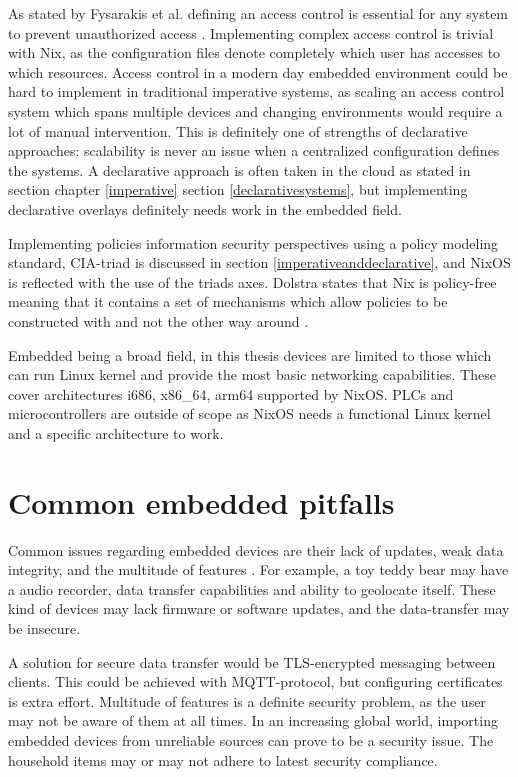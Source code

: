 As stated by Fysarakis et al. defining an access control is essential
for any system to prevent unauthorized access
\cite{fysarakis2014embedded}. Implementing complex access control is
trivial with Nix, as the configuration files denote completely which
user has accesses to which resources. Access control in a modern day
embedded environment could be hard to implement in traditional
imperative systems, as scaling an access control system which spans
multiple devices and changing environments would require a lot of
manual intervention. This is definitely one of strengths of
declarative approaches: scalability is never an issue when a
centralized configuration defines the systems. A declarative approach
is often taken in the cloud as stated in section chapter
\ref{imperative} section \ref{declarativesystems}, but implementing
declarative overlays definitely needs work in the embedded field.

Implementing policies information security perspectives using a policy
modeling standard, CIA-triad is discussed in section
\ref{imperativeanddeclarative}, and NixOS is reflected with the use of
the triads axes. Dolstra states that Nix is policy-free meaning that
it contains a set of mechanisms which allow policies to be constructed
with and not the other way around \cite{dolstra2004nix}.

Embedded being a broad field, in this thesis devices are limited to
those which can run Linux kernel and provide the most basic networking
capabilities. These cover architectures i686, x86\_64, arm64 supported
by NixOS. PLCs and microcontrollers are outside of scope as NixOS
needs a functional Linux kernel and a specific architecture to work.

\section{Common embedded pitfalls}

Common issues regarding embedded devices are their lack of updates,
weak data integrity, and the multitude of features
\cite{kemmerer2003cybersecurity, fysarakis2014embedded}. For example,
a toy teddy bear may have a audio recorder, data transfer capabilities
and ability to geolocate itself. These kind of devices may lack
firmware or software updates, and the data-transfer may be insecure.

A solution for secure data transfer would be TLS-encrypted messaging
between clients. This could be achieved with MQTT-protocol, but
configuring certificates is extra effort. Multitude of features is a
definite security problem, as the user may not be aware of them at all
times. In an increasing global world, importing embedded devices from
unreliable sources can prove to be a security issue. The household
items may or may not adhere to latest security
compliance. \cite{fysarakis2014embedded}

